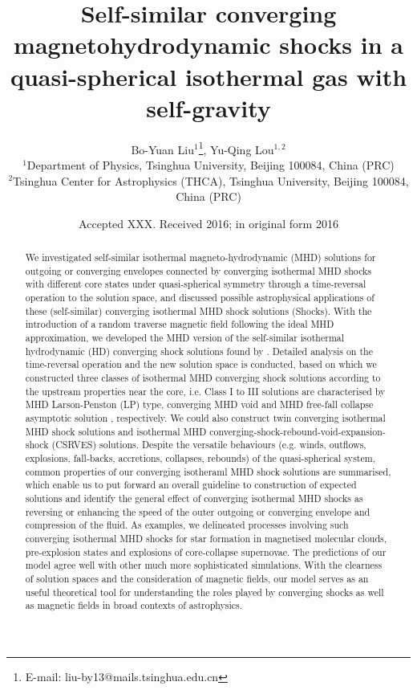 \documentclass[fleqn,usenatbib]{mnras}
\title[Spherical converging isothermal MHD shocks with self-gravity]{Self-similar
  converging magnetohydrodynamic shocks in a quasi-spherical
 isothermal
 gas with self-gravity}
\author[Bo-Yuan Liu]{Bo-Yuan Liu$^{1}$\thanks{E-mail: liu-by13@mails.tsinghua.edu.cn}, Yu-Qing Lou$^{1, 2}$
\\
$^{1}$Department of Physics, Tsinghua University, Beijing 100084, China (PRC)\\
$^{2}$Tsinghua Center for Astrophysics (THCA), Tsinghua University, Beijing 100084, China (PRC)\\
}
\date{Accepted XXX. Received 2016; in original form 2016}
\begin{document}
\label{firstpage}
\pagerange{\pageref{firstpage}--\pageref{lastpage}}
\maketitle

\begin{abstract}
We investigated self-similar isothermal magneto-hydrodynamic (MHD) solutions for outgoing or converging envelopes connected by converging isothermal MHD shocks with different core states under quasi-spherical symmetry through a time-reversal operation to the solution space, and discussed possible astrophysical applications of these (self-similar) converging isothermal MHD shock solutions (Shocks). With the introduction of a random traverse magnetic field following the ideal MHD approximation, we developed the MHD version of the self-similar isothermal hydrodynamic (HD) converging shock solutions found by \citet{lou2014self}. 
Detailed analysis on the time-reversal operation and the new solution space is conducted, based on which we constructed three classes of isothermal MHD converging shock solutions according to the upstream properties near the core, i.e. Class I to III solutions are characterised by MHD Larson-Penston (LP) type, converging MHD void and MHD free-fall collapse asymptotic solution \citep{yuLou2006}, respectively. We could also construct twin converging isothermal MHD shock solutions and isothermal MHD converging-shock-rebound-void-expansion-shock (CSRVES) solutions. Despite the versatile behaviours (e.g. winds, outflows, explosions, fall-backs, accretions, collapses, rebounds) of the quasi-spherical system, common properties of our converging isotheraml MHD shock solutions are summarised, which enable us to put forward an overall guideline to construction of expected solutions and identify the general effect of converging isothermal MHD shocks as reversing or enhancing the speed of the outer outgoing or converging envelope and compression of the fluid. As examples, we delineated processes involving such converging isothermal MHD shocks for star formation in magnetised molecular clouds, pre-explosion states and explosions of core-collapse supernovae. The predictions of our model agree well with other much more sophisticated simulations. With the clearness of solution spaces and the consideration of magnetic fields, our model serves as an useful theoretical tool for understanding the roles played by converging shocks as well as magnetic fields in broad contexts of astrophysics. 


\end{abstract}
\end{document}
